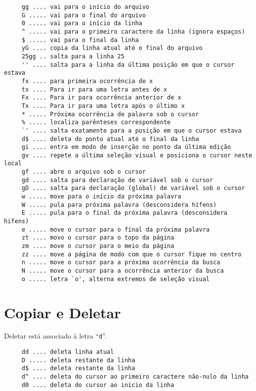 \begin{verbatim}
     gg .... vai para o início do arquivo
     G ..... vai para o final do arquivo
     0 ..... vai para o início da linha
     ^ ..... vai para o primeiro caractere da linha (ignora espaços)
     $ ..... vai para o final da linha
     yG .... copia da linha atual até o final do arquivo
     25gg .. salta para a linha 25
     '' .... salta para a linha da última posição em que o cursor estava
     fx .... para primeira ocorrência de x
     tx .... Para ir para uma letra antes de x
     Fx .... Para ir para ocorrência anterior de x
     Tx .... Para ir para uma letra após o último x
     * ..... Próxima ocorrência de palavra sob o cursor
     % ..... localiza parênteses correspondente
     `' .... salta exatamente para a posição em que o cursor estava
     d$ .... deleta do ponto atual até o final da linha
     gi .... entra em modo de inserção no ponto da última edição
     gv .... repete a última seleção visual e posiciona o cursor neste local
     gf .... abre o arquivo sob o cursor
     gd .... salta para declaração de variável sob o cursor
     gD .... salta para declaração (global) de variável sob o cursor
     w ..... move para o início da próxima palavra
     W ..... pula para próxima palavra (desconsidera hífens)
     E ..... pula para o final da próxima palavra (desconsidera hifens)
     e ..... move o cursor para o final da próxima palavra
     zt .... movo o cursor para o topo da página
     zm .... move o cursor para o meio da página
     zz .... move a página de modo com que o cursor fique no centro
     n ..... move o cursor para a próxima ocorrência da busca
     N ..... move o cursor para a ocorrência anterior da busca
     o ..... letra `o', alterna extremos de seleção visual
\end{verbatim}

\section{Copiar e Deletar}\label{sec:Copiar e Deletar}

Deletar está associado à letra ``\verb|d|''.

\begin{verbatim}
     dd .... deleta linha atual
     D ..... deleta restante da linha
     d$ .... deleta restante da linha
     d^ .... deleta do cursor ao primeiro caractere não-nulo da linha
     d0 .... deleta do cursor ao início da linha
\end{verbatim}


